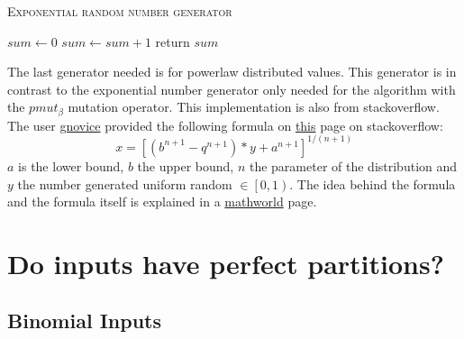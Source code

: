 \begin{algorithm}[h]
      \caption{\textsc{Exponential random number generator}}\label{alg:exponentialRNG}

      \DontPrintSemicolon %
      $sum \leftarrow 0$\; \tcp{random() generates a random value $\in \left[0, 1\right)$}
      {
            $sum \leftarrow sum+1$\;
      }
      return $sum$\;
\end{algorithm}

The last generator needed is for powerlaw distributed values. This generator is in contrast to the exponential number generator only needed for the algorithm with the $pmut_\beta$ mutation operator. This implementation is also from stackoverflow. The user \href{https://stackoverflow.com/users/52738/gnovice}{gnovice} provided the following formula on \href{https://stackoverflow.com/questions/918736/random-number-generator-that-produces-a-power-law-distribution}{this} page on stackoverflow:
\[
      x = {[(b^{n+1} - q^{n+1})*y + a^{n+1}]}^{1/(n+1)}
\]
$a$ is the lower bound, $b$ the upper bound, $n$ the parameter of the distribution and $y$ the number generated uniform random $\in \left[0, 1\right)$. The idea behind the formula and the formula itself is explained in a \href{https://mathworld.wolfram.com/RandomNumber.html}{mathworld} page.


\section{Do inputs have perfect partitions?}
\subsection{Binomial Inputs}

